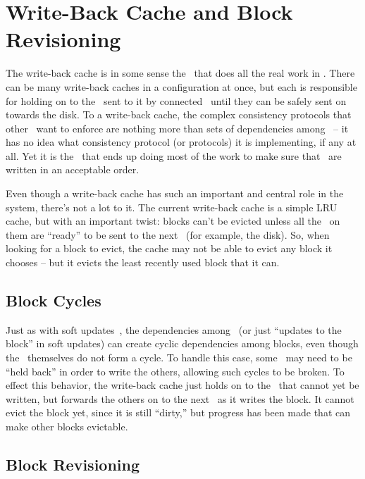\section{Write-Back Cache and Block Revisioning}
\label{sec:wbcache}

The write-back cache is in some sense the \module\ that does all the real work
in \Kudos. There can be many write-back caches in a configuration at once, but
each is responsible for holding on to the \chdescs\ sent to it by connected
\modules\ until they can be safely sent on towards the disk. To a write-back
cache, the complex consistency protocols that other \modules\ want to enforce
are nothing more than sets of dependencies among \chdescs\ -- it has no idea
what consistency protocol (or protocols) it is implementing, if any at all. Yet
it is the \module\ that ends up doing most of the work to make sure that
\chdescs\ are written in an acceptable order.

Even though a write-back cache has such an important and central role in the
system, there's not a lot to it. The current write-back cache is a simple LRU
cache, but with an important twist: blocks can't be evicted unless all the
\chdescs\ on them are ``ready'' to be sent to the next \module\ (for example,
the disk). So, when looking for a block to evict, the cache may not be able to
evict any block it chooses -- but it evicts the least recently used block that
it can.

\subsection{Block Cycles}
\label{subsec:blockcycles}

Just as with soft updates~\cite{ganger00soft}, the dependencies among \chdescs\
(or just ``updates to the block'' in soft updates) can create cyclic
dependencies among blocks, even though the \chdescs\ themselves do not form a
cycle. To handle this case, some \chdescs\ may need to be ``held back'' in order
to write the others, allowing such cycles to be broken. To effect this behavior,
the write-back cache just holds on to the \chdescs\ that cannot yet be written,
but forwards the others on to the next \module\ as it writes the block. It
cannot evict the block yet, since it is still ``dirty,'' but progress has been
made that can make other blocks evictable.

\subsection{Block Revisioning}

